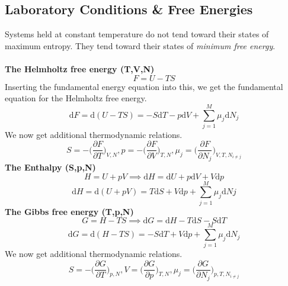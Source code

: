 \documentclass[8pt]{article}
\numberwithin{equation}{section}
\begin{document}
\begin{multicols}{2}
\section{Laboratory Conditions \& Free Energies}
Systems held at constant temperature do not tend toward their states of maximum entropy. They tend toward their states of \textit{minimum free energy}. \\ \\
\textbf{The Helmholtz free energy (T,V,N)} 
\begin{equation}
F=U-TS \tag{8.5}
\end{equation}
Inserting the fundamental energy equation into this, we get the fundamental equation for the Helmholtz free energy. 
\begin{equation}
\mathrm{d}F=\mathrm{d}(U-TS)=-S\mathrm{d}T-p\mathrm{d}V+\sum_{j=1}^{M}\mu_{j}\mathrm{d}N_{j} \tag{8.10}
\end{equation}
We now get additional thermodynamic relations. 
\begin{equation}
S=-\bigg( \frac{\partial F}{\partial T}\bigg)_{V,N}, p=-\bigg( \frac{\partial F}{\partial V} \bigg)_{T,N}, \mu_{j}=\bigg( \frac{\partial F}{\partial N_{j}} \bigg)_{V,T, N_{i\neq j}} \tag{8.12}
\end{equation}
\textbf{The Enthalpy (S,p,N)}
\begin{equation}
H=U+pV \implies \mathrm{d}H=\mathrm{d}U+p\mathrm{d}V+V\mathrm{d}p \tag{8.13}
\end{equation}
\begin{equation}
\mathrm{d}H=\mathrm{d}(U+pV)=T\mathrm{d}S+V\mathrm{d}p+\sum_{j=1}^{M}\mu_{j}\mathrm{d}N{j} \tag{8.15}
\end{equation}
\textbf{The Gibbs free energy (T,p,N)} 
\begin{equation}
G=H-TS \implies \mathrm{d} G=\mathrm{d}H-T\mathrm{d}S-S\mathrm{d}T \tag{8.16}
\end{equation}
\begin{equation}
\mathrm{d}G=\mathrm{d}(H-TS)=-S\mathrm{d}T+V\mathrm{d}p+\sum_{j=1}^{M}\mu_{j}\mathrm{d}N_{j} \tag{8.18}
\end{equation}
We now get additional thermodynamic relations. 
\begin{equation}
S=-\bigg( \frac{\partial G}{\partial T} \bigg)_{p,N}, V=\bigg( \frac{\partial G}{\partial p} \bigg)_{T,N}, \mu_{j}=\bigg( \frac{\partial G}{\partial N_{j}} \bigg)_{p,T, N_{i\neq j}} \tag{8.20}
\end{equation}

\end{multicols}
\end{document}
